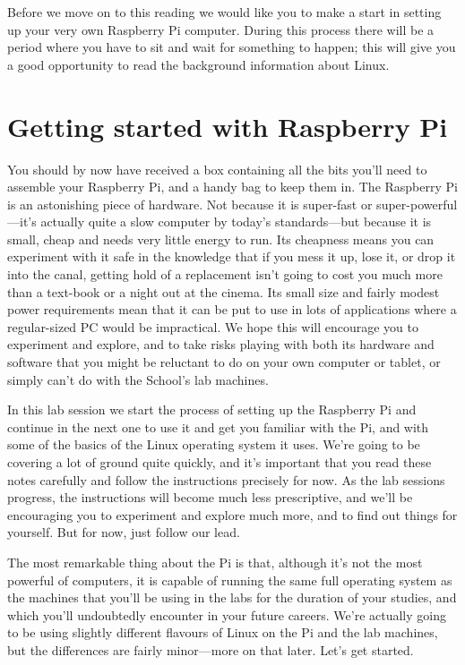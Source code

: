 Before we move on to this reading we would like you to make a start in setting up your very own Raspberry Pi computer. During this process there will be a period where you have to sit and wait for something to happen; this will give you a good opportunity to read the background information about Linux.

\section{Getting started with Raspberry Pi}

You should by now have received a box containing all the bits you'll need to assemble your Raspberry Pi, and a handy bag to keep them in. The Raspberry Pi is an astonishing piece of hardware. Not because it is super-fast or super-powerful---it's actually quite a slow computer by today's standards---but because it is small, cheap and needs very little energy to run. Its cheapness means you can experiment with it safe in the knowledge that if you mess it up, lose it, or drop it into the canal, getting hold of a replacement isn't going to cost you much more than a text-book or a night out at the cinema. Its small size and fairly modest power requirements mean that it can be put to use in lots of applications where a regular-sized PC would be impractical.  We hope this will encourage you to experiment and explore, and to take risks playing with both its hardware and software that you might be reluctant to do on your own computer or tablet, or simply can't do with the School's lab machines. 

In this lab session we start the process of setting up the  Raspberry Pi and continue in the next one to use it and get you familiar with the Pi, and with some of the basics of the Linux operating system it uses. We're going to be covering a lot of ground quite quickly, and it's important that you read these notes carefully and follow the instructions precisely for now. As the lab sessions progress, the instructions will become much less prescriptive, and we'll be encouraging you to experiment and explore much more, and to find out things for yourself. But for now, just follow our lead. 

The most remarkable thing about the Pi is that, although it's not the most powerful of computers, it is capable of running the same full  operating system as the machines that you'll be using in the labs for the duration of your studies, and which you'll undoubtedly encounter in your future careers. We're actually going to be using slightly different flavours of Linux on the Pi and the lab machines, but the differences are fairly minor---more on that later. Let's get started. 

